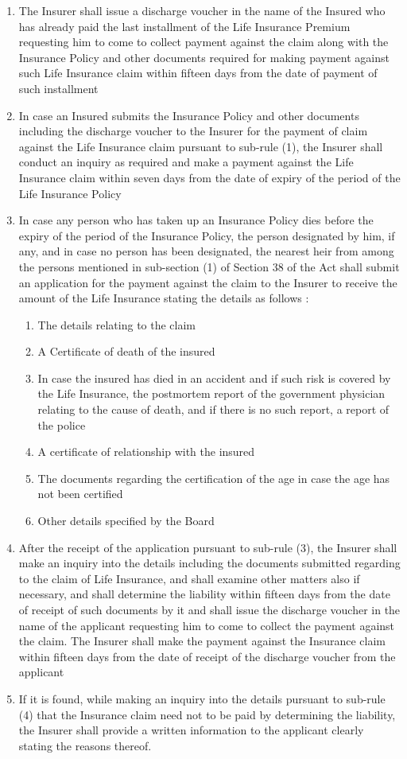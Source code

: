 \begin{enumerate}
	\item The Insurer shall issue a discharge voucher in the name of the Insured who has already paid the last installment of the Life Insurance Premium requesting him to come to collect payment against the claim along with the Insurance Policy and other documents required for making payment against such Life Insurance claim within fifteen days from the date of payment of such installment
	\item In case an Insured submits the Insurance Policy and other documents including the
	discharge voucher to the Insurer for the payment of claim against the Life Insurance claim pursuant to sub-rule (1), the Insurer shall conduct an inquiry as required and make a payment against the Life Insurance claim within seven days from the date of expiry of the
	period of the Life Insurance Policy
	\item In case any person who has taken up an Insurance Policy dies before the expiry of the
	period of the Insurance Policy, the person designated by him, if any, and in case no person has been designated, the nearest heir from among the persons mentioned in sub-section (1) of Section 38 of the Act shall submit an application for the payment against the claim to the
	Insurer to receive the amount of the Life Insurance stating the details as follows :
	\begin{enumerate}
		\item The details relating to the claim
		\item  A Certificate of death of the insured
		\item In case the insured has died in an accident and if such risk is covered by the Life Insurance, the postmortem report of the government physician relating to the cause of death, and if there is no such report, a report of the police
		\item A certificate of relationship with the insured
		\item The documents regarding the certification of the age in case the age has not been certified
		\item Other details specified by the Board
	\end{enumerate}
	\item After the receipt of the application pursuant to sub-rule (3), the Insurer shall make an inquiry into the details including the documents submitted regarding to the claim of Life Insurance, and shall examine other matters also if necessary, and shall determine the liability within fifteen days from the date of receipt of such documents by it and shall issue the discharge voucher in the name of the applicant requesting him to come to collect the payment against the claim. The Insurer shall make the payment against the Insurance
	claim within fifteen days from the date of receipt of the discharge voucher from the applicant
	\item If it is found, while making an inquiry into the details pursuant to sub-rule (4) that the
	Insurance claim need not to be paid by determining the liability, the Insurer shall provide
	a written information to the applicant clearly stating the reasons thereof.
\end{enumerate}
%
